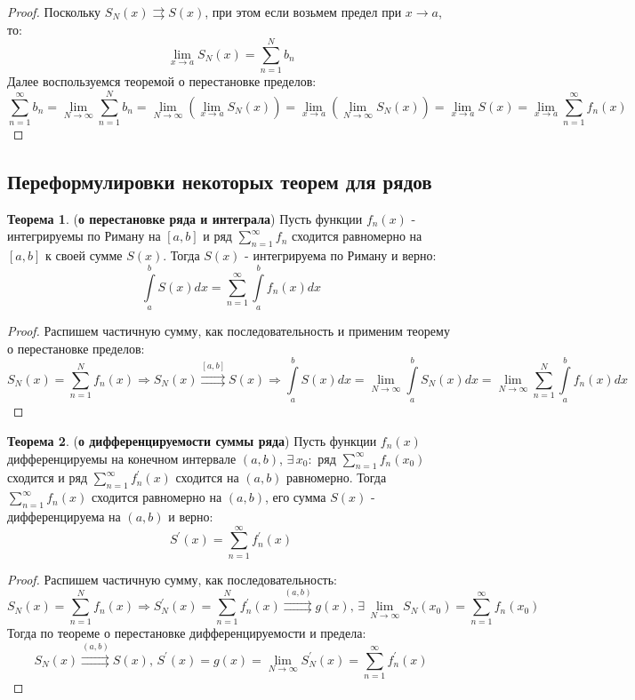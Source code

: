 \documentclass[12pt]{article}
\theoremstyle{definition}
\newtheorem{theorem}{Теорема}
\newcommand{\ddsum}[2]{\displaystyle\sum\limits_{#1}^{#2}}
\newcommand{\ddint}[2]{\displaystyle\int\limits_{#1}^{#2}}
\newcommand{\uconv}[1]{\overset{#1}{\rightrightarrows}}
\begin{document}
\begin{proof}
	Поскольку $S_N(x) \uconv{} S(x)$, при этом если возьмем предел при $x \to a$, то:
	$$
		\lim\limits_{x \to a}S_N(x) = \sum\limits_{n = 1}^{N} b_n
	$$
	Далее воспользуемся теоремой о перестановке пределов:
	$$
		\sum\limits_{n = 1}^{\infty}b_n = \lim\limits_{N \to \infty}\sum\limits_{n = 1}^{N} b_n = \lim\limits_{N \to \infty}\left(\lim\limits_{x \to a}S_N(x)\right) = \lim\limits_{x \to a}\left(\lim\limits_{N \to \infty}S_N(x)\right) = \lim\limits_{x \to a} S(x) = \lim\limits_{x \to a}\sum\limits_{n =1}^{\infty}f_n(x)
	$$
\end{proof}

\newpage
\subsection*{Переформулировки некоторых теорем для рядов}
\begin{theorem}(\textbf{о перестановке ряда и интеграла})
	Пусть функции $f_n(x)$ - интегрируемы по Риману на $[a,b]$ и ряд $\ddsum{n = 1}{\infty}f_n$ сходится равномерно на $[a,b]$ к своей сумме $S(x)$. Тогда $S(x)$ - интегрируема по Риману и верно:
	$$
		\ddint{a}{b}S(x)dx = \ddsum{n = 1}{\infty}\ddint{a}{b}f_n(x)dx
	$$
\end{theorem}
\begin{proof}
	Распишем частичную сумму, как последовательность и применим теорему о перестановке пределов:
	$$
		S_N(x) = \ddsum{n = 1}{N}f_n(x) \Rightarrow S_N(x) \uconv{[a,b]} S(x) \Rightarrow \ddint{a}{b}S(x)dx = \lim\limits_{N \to \infty}\ddint{a}{b}S_N(x)dx = \lim\limits_{N \to \infty}\ddsum{n = 1}{N}\ddint{a}{b}f_n(x)dx
	$$
\end{proof}

\begin{theorem}(\textbf{о дифференцируемости суммы ряда})
	Пусть функции $f_n(x)$ дифференцируемы на конечном интервале $(a,b)$, $\exists \,  x_0 \colon$ ряд $\ddsum{n = 1}{\infty}f_n(x_0)$ сходится и ряд $\ddsum{n = 1}{\infty}f_n^\prime(x)$ сходится на $(a,b)$ равномерно. Тогда $\ddsum{n  = 1}{\infty}f_n(x)$ сходится равномерно на $(a,b)$, его сумма $S(x)$ - дифференцируема на $(a,b)$ и верно:
	$$
		S^\prime(x) = \ddsum{n = 1}{\infty}f_n^\prime(x)
	$$ 
\end{theorem}
\begin{proof}
	Распишем частичную сумму, как последовательность:
	$$
		S_N(x) = \ddsum{n = 1}{N}f_n(x) \Rightarrow S_N^\prime(x) = \ddsum{n = 1}{N}f_n^\prime(x) \uconv{(a,b)} g(x), \, \exists \, \lim\limits_{N \to \infty}S_N(x_0) = \ddsum{n = 1}{\infty}f_n(x_0)
	$$
	Тогда по теореме о перестановке дифференцируемости и предела:
	$$
		S_N(x) \uconv{(a,b)} S(x), \, S^\prime(x) = g(x) = \lim\limits_{N\to \infty}S_N^\prime(x) = \ddsum{n = 1}{\infty}f_n^\prime(x)
	$$
\end{proof}
\end{document}
